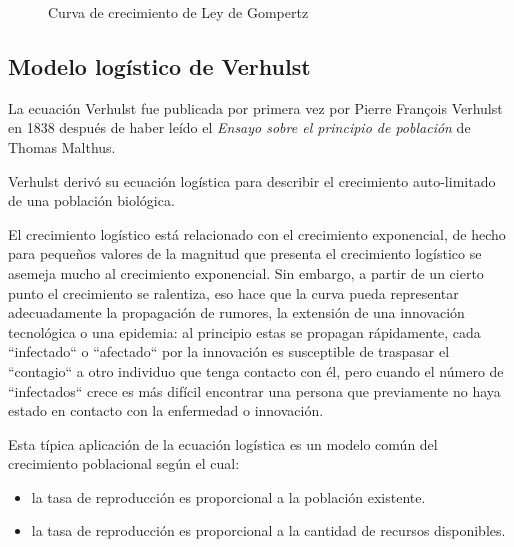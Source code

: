 \begin{figure}[!ht]
\begin{center}
\end{center}\vspace*{-0.6cm}
\caption[Imagen de Oncogenes. Falta poner leyenda]{Curva de crecimiento de Ley de Gompertz}
\label{fig-gompertz}
\end{figure}
\newpage

\subsection{Modelo logístico de Verhulst}
La ecuación Verhulst fue publicada por primera vez por Pierre François Verhulst en 1838 después de haber leído el \textit{Ensayo sobre el principio de población} de Thomas Malthus.

Verhulst derivó su ecuación logística para describir el crecimiento auto-limitado de una población biológica.

El crecimiento logístico está relacionado con el crecimiento exponencial, de hecho para pequeños valores de la magnitud que presenta el crecimiento logístico se asemeja mucho al crecimiento exponencial. Sin embargo, a partir de un cierto punto el crecimiento se ralentiza, eso hace que la curva pueda representar adecuadamente la propagación de rumores, la extensión de una innovación tecnológica o una epidemia: al principio estas se propagan rápidamente, cada ``infectado`` o ``afectado`` por la innovación es susceptible de traspasar el ``contagio`` a otro individuo que tenga contacto con él, pero cuando el número de ``infectados`` crece es más difícil encontrar una persona que previamente no haya estado en contacto con la enfermedad o innovación.

Esta típica aplicación de la ecuación logística es un modelo común del crecimiento poblacional según el cual:
\begin{itemize}
    \item la tasa de reproducción es proporcional a la población existente.
    \item la tasa de reproducción es proporcional a la cantidad de recursos disponibles.
\end{itemize}


